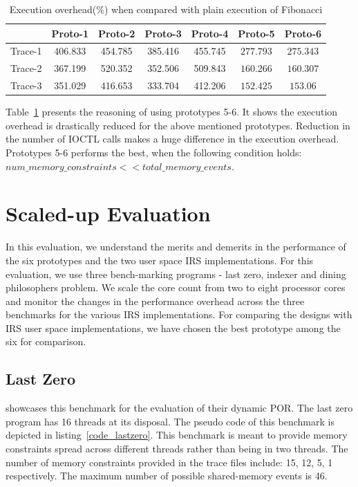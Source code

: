 \begin{table}[h]
\begin{center}
 \begin{tabular}{|c c c c c c c|} 
 \hline
 & Proto-1 & Proto-2 & Proto-3 & Proto-4 & Proto-5 & Proto-6\\ %
 \hline
 Trace-1 & 406.833 & 454.785 & 385.416 & 455.745 & $277.793$ & $275.343$ \\ 
 Trace-2 & 367.199 & 520.352 & 352.506 & 509.843 & $160.266$ & $160.307$ \\
 Trace-3 & 351.029 & 416.653 & 333.704 & 412.206 & $152.425$ & $153.06$\\
 \hline
\end{tabular}
\end{center}
\caption{Execution overhead(\%) when compared with plain execution of Fibonacci}
\label{fib_exec_over}
\end{table}

Table~\ref{fib_exec_over} presents the reasoning of using prototypes 5-6. 
It shows the execution overhead is drastically reduced for the above mentioned prototypes. 
Reduction in the number of IOCTL calls makes a huge difference in the execution overhead. 
Prototypes 5-6 performs the best, when the following condition holds:
$num\_memory\_constraints << total\_memory\_events$.

\section{Scaled-up Evaluation}

In this evaluation, we understand the merits and demerits in the performance of the six prototypes and the two user space IRS implementations. 
For this evaluation, we use three bench-marking programs - last zero, indexer and dining philosophers problem. 
We scale the core count from two to eight processor cores and monitor the changes in the performance overhead across the three benchmarks for the various IRS implementations. 
For comparing the designs with IRS user space implementations, we have chosen the best prototype among the six for comparison. 

\subsection{Last Zero}

\citet{abdulla2014optimal} showcases this benchmark for the evaluation of their dynamic POR. 
The last zero program has 16 threads at its disposal. 
The pseudo code of this benchmark is depicted in listing~\ref{code_lastzero}. 
This benchmark is meant to provide memory constraints spread across different threads rather than being in two threads. 
The number of memory constraints provided in the trace files include: 15, 12, 5, 1 respectively. 
The maximum number of possible shared-memory events is 46.

